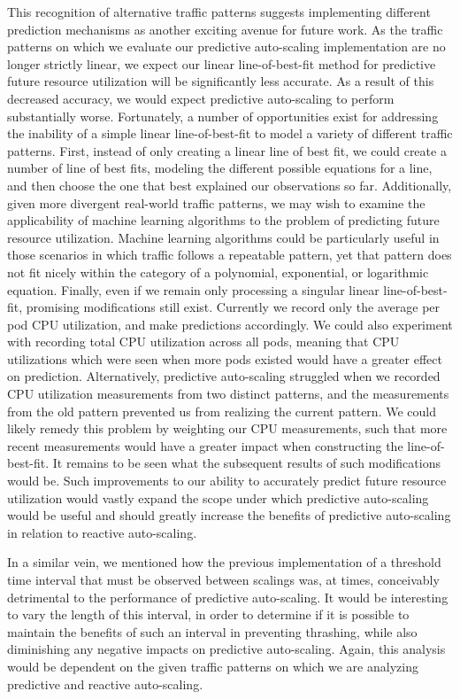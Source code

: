 This recognition of alternative traffic patterns suggests implementing
different prediction mechanisms as another exciting avenue for future work. As
the traffic patterns on which we evaluate our predictive auto-scaling
implementation are no longer strictly linear, we expect our linear
line-of-best-fit method for predictive future resource utilization will be
significantly less accurate. As a result of this decreased accuracy, we would
expect predictive auto-scaling to perform substantially worse. Fortunately, a
number of opportunities exist for addressing the inability of a simple linear
line-of-best-fit to model a variety of different traffic patterns.
First, instead of only creating a linear line of best fit, we could
create a number of line of best fits, modeling the different possible equations
for a line, and then choose the one that best explained our observations so far.
Additionally, given more divergent real-world traffic patterns, we may wish to
examine the applicability of machine learning algorithms to the problem of
predicting future resource utilization. Machine learning algorithms could be
particularly useful in those scenarios in which traffic follows a repeatable
pattern, yet that pattern does not fit nicely within the category of a
polynomial, exponential, or logarithmic equation. Finally, even if we remain
only processing a singular linear line-of-best-fit, promising modifications
still exist. Currently we record only the
average per pod CPU utilization, and make predictions accordingly. We could also
experiment with recording total CPU utilization across all pods, meaning
that CPU utilizations which were seen when more pods existed would have a
greater effect on prediction. Alternatively, predictive auto-scaling struggled
when we recorded CPU utilization measurements from two distinct patterns, and
the measurements from the old pattern prevented us from realizing the current
pattern. We could likely remedy this problem by weighting our CPU measurements,
such that more recent measurements would have a greater impact when constructing the
line-of-best-fit. It remains to be seen what the subsequent results
of such modifications would be. Such improvements to our
ability to accurately predict future resource utilization
would vastly expand the scope under which predictive auto-scaling would be
useful and should greatly increase the benefits of predictive auto-scaling in
relation to reactive auto-scaling.

In a similar vein, we mentioned how the previous implementation of a threshold time
interval that must be observed between scalings was, at times, conceivably
detrimental to the performance of predictive auto-scaling.
It would be interesting to vary the length of this interval, in
order to determine if it is possible to maintain the benefits of such an
interval in preventing
thrashing, while also diminishing any negative impacts on predictive
auto-scaling. Again, this analysis would be dependent on the given traffic
patterns on which we are analyzing predictive and reactive auto-scaling.

